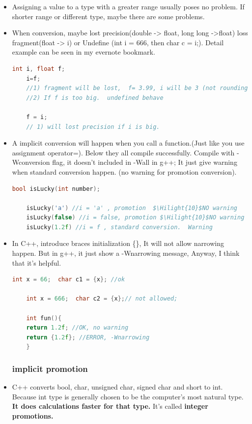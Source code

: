 \documentclass[a4paper,11pt,twoside]{book}
\newcommand{\Hilight}[1]{\makebox[0pt][l]{\color{yellow}\rule[-3pt]{#1em}{11pt}}}
\newcommand{\Hilight}[1]{}
\begin{document}
\begin{itemize}
	\item Assigning a value to a type with a greater range usually poses no problem. If shorter range or different type, maybe there are some problems.
	
	\item When conversion, maybe lost precision(double -> float, long long ->float) loss fragment(float -> i) or Undefine (int i = 666, then char c = i;). Detail example can be seen in my evernote bookmark.
	
	\begin{lstlisting}[frame=single, language=c++]
	int i, float f;
	i=f;
	//1) fragment will be lost,  f= 3.99, i will be 3 (not rounding)
	//2) If f is too big.  undefined behave
	
	f = i;
	// 1) will lost precision if i is big.
	\end{lstlisting}
	
	\item A implicit conversion will happen when you call a function.(Just like you use assignment operator=). Below they all compile successfully. Compile with -Wconversion flag, it doesn't included in -Wall in g++; It just give warning when standard conversion happen. (no warning for promotion conversion).
	\begin{lstlisting}[frame=single, language=c++]
	bool isLucky(int number);
	
	isLucky('a') //i = 'a' , promotion  $\Hilight{10}$NO warning
	isLucky(false) //i = false, promotion $\Hilight{10}$NO warning
	isLucky(1.2f) //i = f , standard conversion.  Warning
	\end{lstlisting}
	
	
	
	\item In C++, introduce braces initialization \{\}, It will not allow narrowing happen. But in g++, it just show a -Wnarrowing message, Anyway, I think that it's helpful.
	\begin{lstlisting}[frame=single, language=c++]
	int x = 66;  char c1 = {x}; //ok
	
	int x = 666;  char c2 = {x};// not allowed;
	
	int fun(){
	return 1.2f; //OK, no warning
	return {1.2f}; //ERROR, -Wnarrowing
	}
	\end{lstlisting}
	
	\subsubsection{implicit promotion}
	\item C++ converts bool, char, unsigned char, signed char and short to int. Because int type is generally chosen to be the computer's most natural type. \textbf{It does calculations faster for that type.} It's called \textbf{integer promotions.}
	

\end{itemize}
\end{document}
